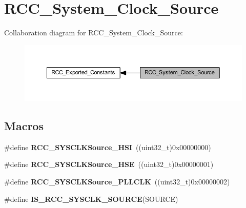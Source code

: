 \hypertarget{group___r_c_c___system___clock___source}{}\section{R\+C\+C\+\_\+\+System\+\_\+\+Clock\+\_\+\+Source}
\label{group___r_c_c___system___clock___source}
Collaboration diagram for R\+C\+C\+\_\+\+System\+\_\+\+Clock\+\_\+\+Source\+:\nopagebreak
\begin{figure}[H]
\begin{center}
\leavevmode
\includegraphics[width=350pt]{group___r_c_c___system___clock___source}
\end{center}
\end{figure}
\subsection*{Macros}
\begin{DoxyCompactItemize}
\item 
\mbox{\label{group___r_c_c___system___clock___source_ga0f392254e74dd965c48edd5aad148e20}} 
\#define {\bfseries R\+C\+C\+\_\+\+S\+Y\+S\+C\+L\+K\+Source\+\_\+\+H\+SI}~((uint32\+\_\+t)0x00000000)
\item 
\mbox{\label{group___r_c_c___system___clock___source_gabeae110e41833842f8620647ea0ce85a}} 
\#define {\bfseries R\+C\+C\+\_\+\+S\+Y\+S\+C\+L\+K\+Source\+\_\+\+H\+SE}~((uint32\+\_\+t)0x00000001)
\item 
\mbox{\label{group___r_c_c___system___clock___source_ga9301b7a07a7cb8c2c6ed87b619c1c966}} 
\#define {\bfseries R\+C\+C\+\_\+\+S\+Y\+S\+C\+L\+K\+Source\+\_\+\+P\+L\+L\+C\+LK}~((uint32\+\_\+t)0x00000002)
\item 
\#define {\bfseries I\+S\+\_\+\+R\+C\+C\+\_\+\+S\+Y\+S\+C\+L\+K\+\_\+\+S\+O\+U\+R\+CE}(S\+O\+U\+R\+CE)
\end{DoxyCompactItemize}


